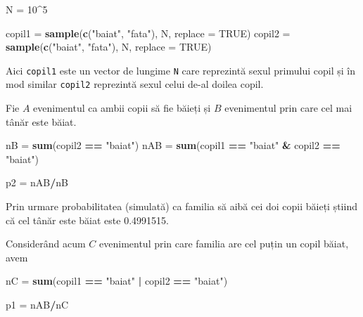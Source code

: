 \documentclass[]{article}
\newenvironment{Shaded}{\begin{snugshade}}{\end{snugshade}}
\newcommand{\KeywordTok}[1]{\textcolor[rgb]{0.13,0.29,0.53}{\textbf{#1}}}
\newcommand{\DataTypeTok}[1]{\textcolor[rgb]{0.13,0.29,0.53}{#1}}
\newcommand{\DecValTok}[1]{\textcolor[rgb]{0.00,0.00,0.81}{#1}}
\newcommand{\StringTok}[1]{\textcolor[rgb]{0.31,0.60,0.02}{#1}}
\newcommand{\OtherTok}[1]{\textcolor[rgb]{0.56,0.35,0.01}{#1}}
\newcommand{\OperatorTok}[1]{\textcolor[rgb]{0.81,0.36,0.00}{\textbf{#1}}}
\newcommand{\NormalTok}[1]{#1}
\begin{document}
\begin{Shaded}
\begin{Highlighting}[]
\NormalTok{N =}\StringTok{ }\DecValTok{10}\OperatorTok{^}\DecValTok{5}

\NormalTok{copil1 =}\StringTok{ }\KeywordTok{sample}\NormalTok{(}\KeywordTok{c}\NormalTok{(}\StringTok{"baiat"}\NormalTok{, }\StringTok{"fata"}\NormalTok{), N, }\DataTypeTok{replace =} \OtherTok{TRUE}\NormalTok{)}
\NormalTok{copil2 =}\StringTok{ }\KeywordTok{sample}\NormalTok{(}\KeywordTok{c}\NormalTok{(}\StringTok{"baiat"}\NormalTok{, }\StringTok{"fata"}\NormalTok{), N, }\DataTypeTok{replace =} \OtherTok{TRUE}\NormalTok{)}
\end{Highlighting}
\end{Shaded}

Aici \texttt{copil1} este un vector de lungime \texttt{N} care
reprezintă sexul primului copil și în mod similar \texttt{copil2}
reprezintă sexul celui de-al doilea copil.

Fie \(A\) evenimentul ca ambii copii să fie băieți și \(B\) evenimentul
prin care cel mai tânăr este băiat.

\begin{Shaded}
\begin{Highlighting}[]
\NormalTok{nB =}\StringTok{ }\KeywordTok{sum}\NormalTok{(copil2 }\OperatorTok{==}\StringTok{ "baiat"}\NormalTok{)}
\NormalTok{nAB =}\StringTok{ }\KeywordTok{sum}\NormalTok{(copil1 }\OperatorTok{==}\StringTok{ "baiat"} \OperatorTok{&}\StringTok{ }\NormalTok{copil2 }\OperatorTok{==}\StringTok{ "baiat"}\NormalTok{)}

\NormalTok{p2 =}\StringTok{ }\NormalTok{nAB}\OperatorTok{/}\NormalTok{nB}
\end{Highlighting}
\end{Shaded}

Prin urmare probabilitatea (simulată) ca familia să aibă cei doi copii
băieți știind că cel tânăr este băiat este 0.4991515.

Considerând acum \(C\) evenimentul prin care familia are cel puțin un
copil băiat, avem

\begin{Shaded}
\begin{Highlighting}[]
\NormalTok{nC =}\StringTok{ }\KeywordTok{sum}\NormalTok{(copil1 }\OperatorTok{==}\StringTok{ "baiat"} \OperatorTok{|}\StringTok{ }\NormalTok{copil2 }\OperatorTok{==}\StringTok{ "baiat"}\NormalTok{)}

\NormalTok{p1 =}\StringTok{ }\NormalTok{nAB}\OperatorTok{/}\NormalTok{nC}
\end{Highlighting}
\end{Shaded}
\end{document}

